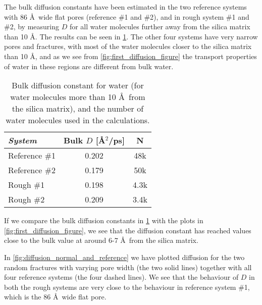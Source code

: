 The bulk diffusion constants have been estimated in the two reference systems with 86 \AA\ wide flat pores (reference \#1 and \#2), and in rough system \#1 and \#2, by measuring $D$ for all water molecules further away from the silica matrix than 10 \AA. The results can be seen in \cref{tab:bulk_water_diffusion}. The other four systems have very narrow pores and fractures, with most of the water molecules closer to the silica matrix than 10 \AA, and as we see from \cref{fig:first_diffusion_figure} the transport properties of water in these regions are different from bulk water.
%
\begin{table}[!htb]%
    \centering%
    \begin{tabular}{l|cc}%
        \textit{System} & Bulk $D$ [\AA$^2$/ps] & N    \\\hline
        Reference \#1   & 0.202                 & 48k  \\ %
        Reference \#2   & 0.179                 & 50k  \\ %
        Rough \#1       & 0.198                 & 4.3k \\ %
        Rough \#2       & 0.209                 & 3.4k \\ %
    \end{tabular}%
    \vspace{8pt}%
    \caption{%
        Bulk diffusion constant for water (for water molecules more than 10 \AA\ from the silica matrix), and the number of water molecules used in the calculations. %
        \label{tab:bulk_water_diffusion}%
    }%
\end{table}

If we compare the bulk diffusion constants in \cref{tab:bulk_water_diffusion} with the plots in \cref{fig:first_diffusion_figure}, we see that the diffusion constant has reached values close to the bulk value at around 6-7 \AA\ from the silica matrix.

In \cref{fig:diffusion_normal_and_reference} we have plotted diffusion for the two random fractures with varying pore width (the two solid lines) together with all four reference systems (the four dashed lines). We see that the behaviour of $D$ in both the rough systems are very close to the behaviour in reference system \#1, which is the 86 \AA\ wide flat pore. 


